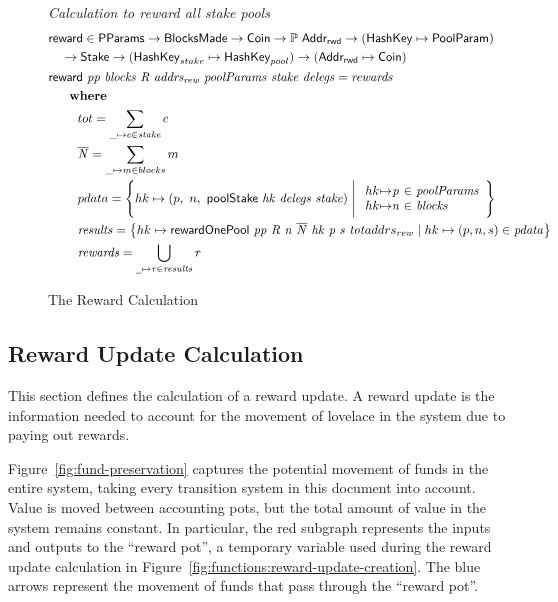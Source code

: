 \begin{figure}[htb]
  \emph{Calculation to reward all stake pools}
  \begin{align*}
      & \fun{reward} \in \PParams \to \BlocksMade \to \Coin\to \powerset{\AddrRWD}
      \to (\HashKey \mapsto \PoolParam) \\
      & ~~~\to \Stake \to (\HashKey_{stake} \mapsto \HashKey_{pool}) \to
      (\AddrRWD \mapsto \Coin)\\
      & \reward{pp}{blocks}{R}{addrs_{rew}}{poolParams}{stake}{delegs}
          = \var{rewards}\\
      & ~~~\where \\
      & ~~~~~~~tot = \sum_{\_\mapsto c\in \var{stake}}c \\
      & ~~~~~~~\var{\overline{N}} = \sum_{\_\mapsto m\in blocks}m \\
      & ~~~~~~~pdata = \left\{
        hk\mapsto \left(p,~n,~\poolStake{hk}{delegs}{stake}\right)
        \mathrel{\Bigg|}
        \begin{array}{r@{\mapsto}c@{~\in~}l}
          hk & \var{p} & \var{poolParams} \\
          hk & \var{n} & \var{blocks} \\
        \end{array}
      \right\} \\
      & ~~~~~~~\var{results} = \left\{
        hk \mapsto \rewardOnePool{pp}{R}{n}{\overline{N}}{hk}{p}{s}{tot}{addrs_{rew}}
                 \mid
        hk\mapsto(p, n, s)\in\var{pdata} \right\} \\
      & ~~~~~~~\var{rewards} = \bigcup_{\wcard\mapsto\var{r}\in\var{results}}\var{r}
  \end{align*}
  \caption{The Reward Calculation}
  \label{fig:functions:reward-calc}
\end{figure}

\clearpage

\subsection{Reward Update Calculation}
\label{sec:reward-calc}

This section defines the calculation of a reward update.
A reward update is the information needed to account for the movement of lovelace
in the system due to paying out rewards.

Figure~\ref{fig:fund-preservation} captures the potential movement of funds in the entire system,
taking every transition system in this document into account.  Value is moved between
accounting pots, but the total amount of value in the system remains constant.
In particular, the red subgraph represents the inputs and outputs to
the ``reward pot'', a temporary variable used during the reward update calculation in
Figure~\ref{fig:functions:reward-update-creation}.
The blue arrows represent the movement of funds that pass through the ``reward pot''.


